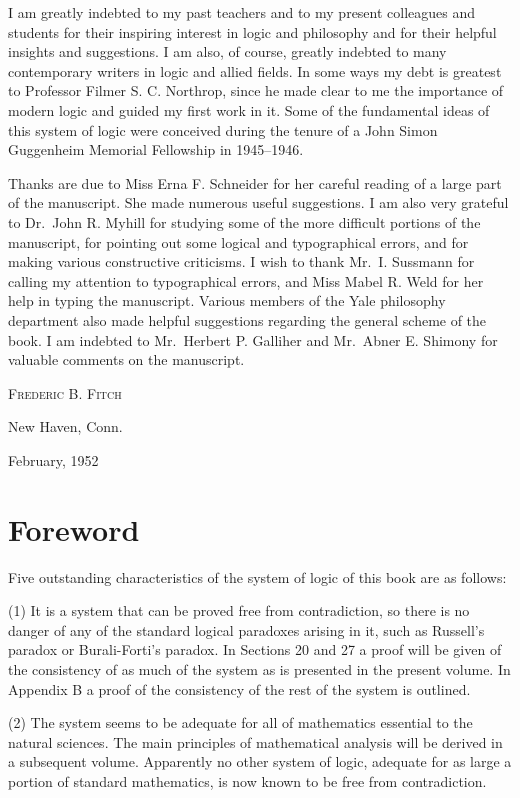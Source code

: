 \documentclass{book}
\begin{document}
I am greatly indebted to my past teachers and to my present colleagues and students for their inspiring interest in logic and philosophy and for their helpful insights and suggestions.  I am also, of course, greatly indebted to many contemporary writers in logic and allied fields.  In some ways my debt is greatest to Professor Filmer S. C. Northrop, since he made clear to me the importance of modern logic and guided my first work in it.  Some of the fundamental ideas of this system of logic were conceived during the tenure of a John Simon Guggenheim Memorial Fellowship in 1945–1946.

Thanks are due to Miss Erna F. Schneider for her careful reading of a large part of the manuscript.  She made numerous useful suggestions.  I am also very grateful to Dr.\ John R. Myhill for studying some of the more difficult portions of the manuscript, for pointing out some logical and typographical errors, and for making various constructive criticisms.  I wish to thank Mr.\ I. Sussmann for calling my attention to typographical errors, and Miss Mabel R. Weld for her help in typing the manuscript.  Various members of the Yale philosophy department also made helpful suggestions regarding the general scheme of the book.  I am indebted to Mr.\ Herbert P. Galliher and Mr.\ Abner E. Shimony for valuable comments on the manuscript.

\vspace{1em}
\hfill\textsc{Frederic B. Fitch}

\noindent New Haven, Conn.

February, 1952

\clearpage
{}
\chapter*{Foreword}

Five outstanding characteristics of the system of logic of this book are as follows:

(1) It is a system that can be proved free from contradiction, so there is no danger of any of the standard logical paradoxes arising in it, such as Russell's paradox or Burali-Forti's paradox.  In Sections 20 and 27 a proof will be given of the consistency of as much of the system as is presented in the present volume.  In Appendix B a proof of the consistency of the rest of the system is outlined.

(2) The system seems to be adequate for all of mathematics essential to the natural sciences.  The main principles of mathematical analysis will be derived in a subsequent volume.  Apparently no other system of logic, adequate for as large a portion of standard mathematics, is now known to be free from contradiction.
\end{document}
